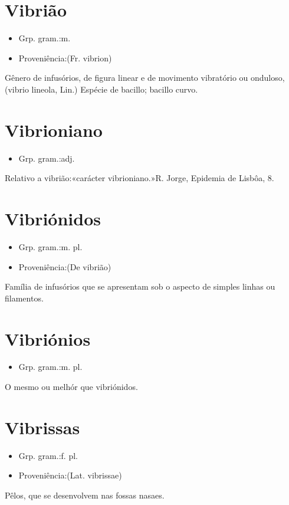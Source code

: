 \documentclass{article}
\begin{document}
\section{Vibrião}
\begin{itemize}
\item {Grp. gram.:m.}
\end{itemize}
\begin{itemize}
\item {Proveniência:(Fr. \textunderscore vibrion\textunderscore )}
\end{itemize}
Gênero de infusórios, de figura linear e de movimento vibratório ou onduloso, (\textunderscore vibrio lineola\textunderscore , Lin.)
Espécie de bacillo; bacillo curvo.
\section{Vibrioniano}
\begin{itemize}
\item {Grp. gram.:adj.}
\end{itemize}
Relativo a vibrião:«\textunderscore carácter vibrioniano.\textunderscore »R. Jorge, \textunderscore Epidemia de Lisbôa\textunderscore , 8.
\section{Vibriónidos}
\begin{itemize}
\item {Grp. gram.:m. pl.}
\end{itemize}
\begin{itemize}
\item {Proveniência:(De \textunderscore vibrião\textunderscore )}
\end{itemize}
Família de infusórios que se apresentam sob o aspecto de simples linhas ou filamentos.
\section{Vibriónios}
\begin{itemize}
\item {Grp. gram.:m. pl.}
\end{itemize}
O mesmo ou melhór que \textunderscore vibriónidos\textunderscore .
\section{Vibrissas}
\begin{itemize}
\item {Grp. gram.:f. pl.}
\end{itemize}
\begin{itemize}
\item {Proveniência:(Lat. \textunderscore vibrissae\textunderscore )}
\end{itemize}
Pêlos, que se desenvolvem nas fossas nasaes.
\end{document}
